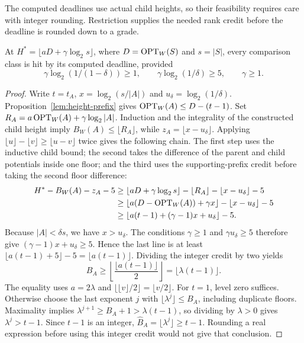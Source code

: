 The computed deadlines use actual child heights, so their feasibility
requires care with integer rounding. Restriction supplies the needed
rank credit before the deadline is rounded down to a grade.

\begin{claim}
\label{clm:qp-rounded-rank}
At $H^*=\lfloor aD+\gamma\log_2s\rfloor$, where
$D=\operatorname{OPT}_W(S)$ and $s=|S|$, every comparison class is hit by its
computed deadline, provided
\begin{equation}\label{eq:qp-max-parameters}
 \gamma\log_2(1/(1-\delta))\ge1,\qquad
 \gamma\log_2(1/\delta)\ge5,\qquad \gamma\ge1.
\end{equation}
\end{claim}
\begin{proof}
Write $t=t_A$, $x=\log_2(s/|A|)$ and
$u_\delta=\log_2(1/\delta)$. Proposition~\ref{lem:height-prefix} gives
$\operatorname{OPT}_W(A)\le D-(t-1)$. Set
$R_A=a\operatorname{OPT}_W(A)+\gamma\log_2|A|$.
Induction and the integrality of the constructed child height imply
$B_W(A)\le\lfloor R_A\rfloor$, while $z_A=\lfloor x-u_\delta\rfloor$.
Applying $\lfloor u\rfloor-\lfloor v\rfloor\ge\lfloor u-v\rfloor$
twice gives the following chain. The first step uses the inductive
child bound; the second takes the difference of the parent and child
potentials inside one floor; and the third uses the supporting-prefix
credit before taking the second floor difference:
\[
\begin{aligned}
 H^*-B_W(A)-z_A-5
 &\ge\lfloor aD+\gamma\log_2s\rfloor
             -\lfloor R_A\rfloor-\lfloor x-u_\delta\rfloor-5\\
 &\ge\lfloor a(D-\operatorname{OPT}_W(A))+\gamma x\rfloor
             -\lfloor x-u_\delta\rfloor-5\\
 &\ge\lfloor a(t-1)+(\gamma-1)x+u_\delta\rfloor-5.
\end{aligned}
\]
Because $|A|<\delta s$, we have $x>u_\delta$.
The conditions $\gamma\ge1$ and $\gamma u_\delta\ge5$ therefore give
$(\gamma-1)x+u_\delta\ge5$. Hence the last line is at least
$\lfloor a(t-1)+5\rfloor-5=\lfloor a(t-1)\rfloor$.
Dividing the integer credit by two yields
\[
 B_A\ge\left\lfloor\frac{\lfloor a(t-1)\rfloor}{2}\right\rfloor
       =\lfloor\lambda(t-1)\rfloor.
\]
The equality uses $a=2\lambda$ and
$\lfloor\lfloor v\rfloor/2\rfloor=\lfloor v/2\rfloor$.
For $t=1$, level zero suffices. Otherwise choose the last exponent
$j$ with $\lfloor\lambda^j\rfloor\le B_A$, including duplicate
floors. Maximality implies
$\lambda^{j+1}\ge B_A+1>\lambda(t-1)$, so
dividing by $\lambda>0$ gives $\lambda^j>t-1$.
Since $t-1$ is an integer,
$\widehat B_A=\lfloor\lambda^j\rfloor\ge t-1$.
Rounding a real expression before using
this integer credit would not give that conclusion.


\end{proof}
